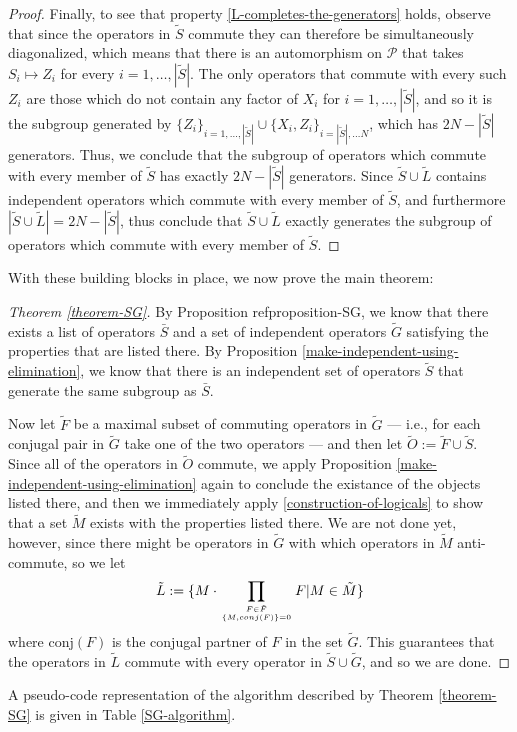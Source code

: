 \documentclass[twocolumn,showpacs,preprintnumbers,amsmath,amssymb,nofootinbib,pra,floatfix]{revtex4}
\newenvironment{remark}[1][Remark]{\begin{trivlist}
\item[\hskip \labelsep {\bfseries #1}]}{\end{trivlist}}
\newcommand{\lst}{\bar}
\newcommand{\set}{\tilde}
\begin{document}
\begin{proof}
Finally, to see that property \ref{L-completes-the-generators} holds, observe that since the operators in $\set S$ commute they can therefore be simultaneously diagonalized, which means that there is an automorphism on $\mathcal{P}$ that takes $S_i\mapsto Z_i$ for every $i=1,\dots,|\set S|$.  The only operators that commute with every such $Z_i$ are those which do not contain any factor of $X_i$ for $i=1,\dots,|\set S|$, and so it is the subgroup generated by $\{Z_i\}_{i=1,\dots,|\set S|}\cup \{X_i,Z_i\}_{i=|\set S|,\dots N}$, which has $2N-|\set S|$ generators.  Thus, we conclude that the subgroup of operators which commute with every member of $\set S$ has exactly $2N-|\set S|$ generators.  Since $\set S\cup\set L$ contains independent operators which commute with every member of $\set S$, and furthermore $|\set S\cup\set L|=2N-|\set S|$, thus conclude that $\set S\cup\set L$ exactly generates the subgroup of operators which commute with every member of $\set S$.
\end{proof}
With these building blocks in place, we now prove the main theorem:

\begin{proof}[Theorem \ref{theorem-SG}]
By Proposition ref{proposition-SG}, we know that there exists a list of operators $\lst S$ and a set of independent operators $\set G$ satisfying the properties that are listed there.  By Proposition \ref{make-independent-using-elimination}, we know that there is an independent set of operators $\set S$ that generate the same subgroup as $\lst S$.  

Now let $\set F$ be a maximal subset of commuting operators in $\set G$ --- i.e., for each conjugal pair in $\set G$ take one of the two operators --- and then let $\set O := \set F \cup \set S$.  Since all of the operators in $\set O$ commute, we apply Proposition \ref{make-independent-using-elimination} again to conclude the existance of the objects listed there, and then we immediately apply \ref{construction-of-logicals} to show that a set $\set M$ exists with the properties listed there.  We are not done yet, however, since there might be operators in $\set G$ with which operators in $\set M$ anti-commute, so we let
$$\set L := \{M\cdot\prod_{F\in \set F\atop \{M,conj(F)\}=0} F | M \in\set M\}$$
where $\text{conj}(F)$ is the conjugal partner of $F$ in the set $\set G$.  This guarantees that the operators in $\set L$ commute with every operator in $\set S\cup\set G$, and so we are done.
\end{proof}
\begin{remark}
A pseudo-code representation of the algorithm described by Theorem \ref{theorem-SG} is given in Table \ref{SG-algorithm}.
\end{remark}
\end{document}
